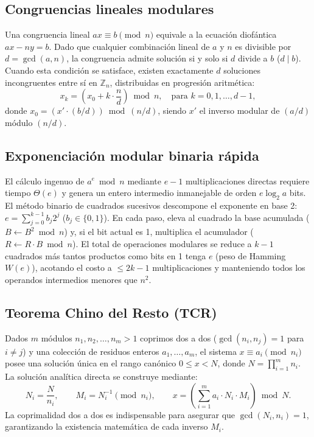 \subsection{Congruencias lineales modulares}
Una congruencia lineal $ax \equiv b \pmod n$ equivale a la ecuación diofántica $ax - ny = b$. Dado que cualquier combinación lineal de $a$ y $n$ es divisible por $d = \gcd(a, n)$, la congruencia admite solución si y solo si $d$ divide a $b$ ($d \mid b$). Cuando esta condición se satisface, existen exactamente $d$ soluciones incongruentes entre sí en $\mathbb{Z}_n$, distribuidas en progresión aritmética:
\begin{equation}
    x_k = \left(x_0 + k \cdot \frac{n}{d}\right) \bmod n, \quad \text{para } k = 0, 1, \dots, d-1,
\end{equation}
donde $x_0 = (x' \cdot (b/d)) \bmod (n/d)$, siendo $x'$ el inverso modular de $(a/d)$ módulo $(n/d)$.

\subsection{Exponenciación modular binaria rápida}
El cálculo ingenuo de $a^e \bmod n$ mediante $e - 1$ multiplicaciones directas requiere tiempo $\Theta(e)$ y genera un entero intermedio inmanejable de orden $e \log_2 a$ bits. El método binario de cuadrados sucesivos descompone el exponente en base 2: $e = \sum_{j=0}^{k-1} b_j 2^j$ ($b_j \in \{0, 1\}$). En cada paso, eleva al cuadrado la base acumulada ($B \leftarrow B^2 \bmod n$) y, si el bit actual es 1, multiplica el acumulador ($R \leftarrow R \cdot B \bmod n$). El total de operaciones modulares se reduce a $k - 1$ cuadrados más tantos productos como bits en 1 tenga $e$ (peso de Hamming $W(e)$), acotando el costo a $\le 2k - 1$ multiplicaciones y manteniendo todos los operandos intermedios menores que $n^2$.

\subsection{Teorema Chino del Resto (TCR)}
Dados $m$ módulos $n_1, n_2, \dots, n_m > 1$ coprimos dos a dos ($\gcd(n_i, n_j) = 1$ para $i \neq j$) y una colección de residuos enteros $a_1, \dots, a_m$, el sistema $x \equiv a_i \pmod{n_i}$ posee una solución única en el rango canónico $0 \le x < N$, donde $N = \prod_{i=1}^m n_i$. La solución analítica directa se construye mediante:
\begin{equation}
    N_i = \frac{N}{n_i}, \qquad M_i = N_i^{-1} \pmod{n_i}, \qquad x = \left(\sum_{i=1}^m a_i \cdot N_i \cdot M_i\right) \bmod N.
\end{equation}
La coprimalidad dos a dos es indispensable para asegurar que $\gcd(N_i, n_i) = 1$, garantizando la existencia matemática de cada inverso $M_i$.
